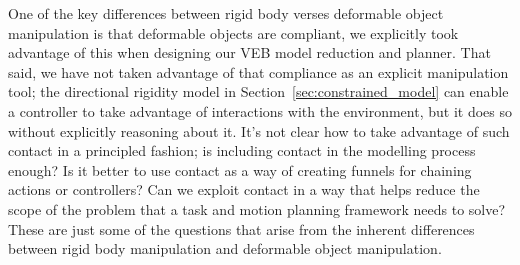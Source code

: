 One of the key differences between rigid body verses deformable object manipulation is that deformable objects are compliant, we explicitly took advantage of this when designing our VEB model reduction and planner. That said, we have not taken advantage of that compliance as an explicit manipulation tool; the directional rigidity model in Section~\ref{sec:constrained_model} can enable a controller to take advantage of interactions with the environment, but it does so without explicitly reasoning about it. It's not clear how to take advantage of such contact in a principled fashion; is including contact in the modelling process enough? Is it better to use contact as a way of creating funnels for chaining actions or controllers? Can we exploit contact in a way that helps reduce the scope of the problem that a task and motion planning framework needs to solve? These are just some of the questions that arise from the inherent differences between rigid body manipulation and deformable object manipulation.